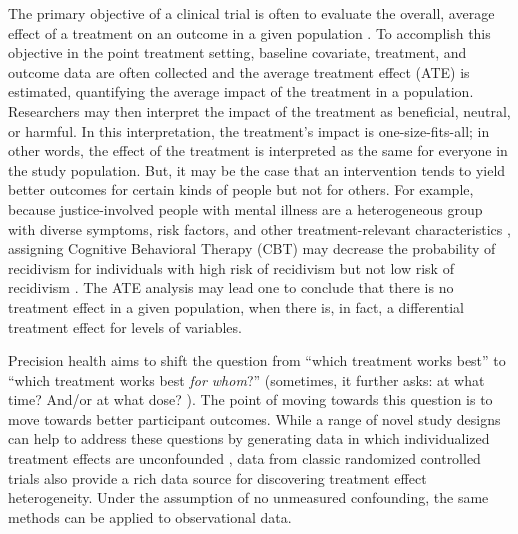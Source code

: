 \documentclass[a4paper,12pt]{article}
\begin{document}
The primary objective of a clinical trial is often to evaluate the overall, average effect of a treatment on an outcome in a given population \citep{dahabreh2016using, kent2018personalized, kosorok2019precision}. To accomplish this objective in the point treatment setting, baseline covariate, treatment, and outcome data are often collected and the average treatment effect (ATE) is estimated, quantifying the average impact of the treatment in a population. Researchers may then interpret the impact of the treatment as beneficial, neutral, or harmful. In this interpretation, the treatment’s impact is one-size-fits-all; in other words, the effect of the treatment is interpreted as the same for everyone in the study population. But, it may be the case that an intervention tends to yield better outcomes for certain kinds of people but not for others. For example, because justice-involved people with mental illness are a heterogeneous group with diverse symptoms, risk factors, and other treatment-relevant characteristics \citep{skeem2011correctional, skeem2014offenders}, assigning Cognitive Behavioral Therapy (CBT) may decrease the probability of recidivism for individuals with high risk of recidivism but not low risk of recidivism \citep{lipsey2007effects}. The ATE analysis may lead one to conclude that there is no treatment effect in a given population, when there is, in fact, a differential treatment effect for levels of variables.

Precision health aims to shift the question from “which treatment works best” to “which treatment works best \emph{for whom}?” (sometimes, it further asks: at what time? And/or at what dose? \citep{kosorok2019precision}). The point of moving towards this question is to move towards better participant outcomes. While a range of novel study designs can help to address these questions by generating data in which individualized treatment effects are unconfounded \citep{kosorok2019precision, lei2012smart, hu2006theory}, data from classic randomized controlled trials also provide a rich data source for discovering treatment effect heterogeneity. Under the assumption of no unmeasured confounding, the same methods can be applied to observational data.
\end{document}
